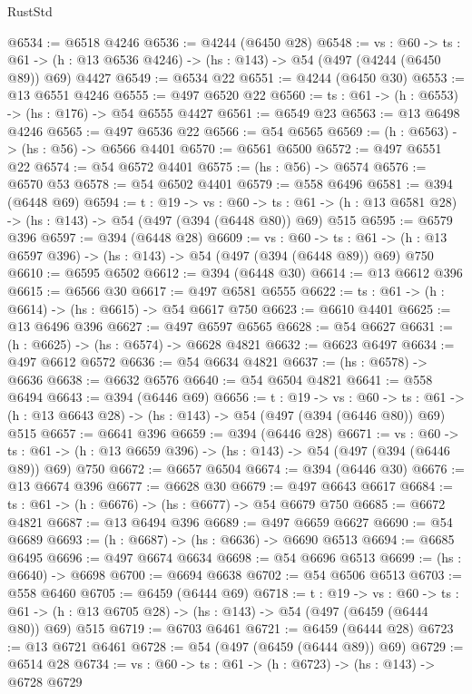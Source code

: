 \begin{lexlean}{RustStd}
\begin{coremodule}
{\begin{coremodule}
{{{{{{{{{{{{@6534 := @6518 @4246
@6536 := @4244 (@6450 @28)
@6548 := {vs : @60} ->
  {ts : @61} -> (h : @13 @6536 @4246) -> (hs : @143) -> @54 (@497 (@4244 (@6450 @89)) @69) @4427
@6549 := @6534 @22
@6551 := @4244 (@6450 @30)
@6553 := @13 @6551 @4246
@6555 := @497 @6520 @22
@6560 := {ts : @61} -> (h : @6553) -> (hs : @176) -> @54 @6555 @4427
@6561 := @6549 @23
@6563 := @13 @6498 @4246
@6565 := @497 @6536 @22
@6566 := @54 @6565
@6569 := (h : @6563) -> (hs : @56) -> @6566 @4401
@6570 := @6561 @6500
@6572 := @497 @6551 @22
@6574 := @54 @6572 @4401
@6575 := (hs : @56) -> @6574
@6576 := @6570 @53
@6578 := @54 @6502 @4401
@6579 := @558 @6496
@6581 := @394 (@6448 @69)
@6594 := {t : @19} ->
  {vs : @60} ->
  {ts : @61} -> (h : @13 @6581 @28) -> (hs : @143) -> @54 (@497 (@394 (@6448 @80)) @69) @515
@6595 := @6579 @396
@6597 := @394 (@6448 @28)
@6609 := {vs : @60} ->
  {ts : @61} -> (h : @13 @6597 @396) -> (hs : @143) -> @54 (@497 (@394 (@6448 @89)) @69) @750
@6610 := @6595 @6502
@6612 := @394 (@6448 @30)
@6614 := @13 @6612 @396
@6615 := @6566 @30
@6617 := @497 @6581 @6555
@6622 := {ts : @61} -> (h : @6614) -> (hs : @6615) -> @54 @6617 @750
@6623 := @6610 @4401
@6625 := @13 @6496 @396
@6627 := @497 @6597 @6565
@6628 := @54 @6627
@6631 := (h : @6625) -> (hs : @6574) -> @6628 @4821
@6632 := @6623 @6497
@6634 := @497 @6612 @6572
@6636 := @54 @6634 @4821
@6637 := (hs : @6578) -> @6636
@6638 := @6632 @6576
@6640 := @54 @6504 @4821
@6641 := @558 @6494
@6643 := @394 (@6446 @69)
@6656 := {t : @19} ->
  {vs : @60} ->
  {ts : @61} -> (h : @13 @6643 @28) -> (hs : @143) -> @54 (@497 (@394 (@6446 @80)) @69) @515
@6657 := @6641 @396
@6659 := @394 (@6446 @28)
@6671 := {vs : @60} ->
  {ts : @61} -> (h : @13 @6659 @396) -> (hs : @143) -> @54 (@497 (@394 (@6446 @89)) @69) @750
@6672 := @6657 @6504
@6674 := @394 (@6446 @30)
@6676 := @13 @6674 @396
@6677 := @6628 @30
@6679 := @497 @6643 @6617
@6684 := {ts : @61} -> (h : @6676) -> (hs : @6677) -> @54 @6679 @750
@6685 := @6672 @4821
@6687 := @13 @6494 @396
@6689 := @497 @6659 @6627
@6690 := @54 @6689
@6693 := (h : @6687) -> (hs : @6636) -> @6690 @6513
@6694 := @6685 @6495
@6696 := @497 @6674 @6634
@6698 := @54 @6696 @6513
@6699 := (hs : @6640) -> @6698
@6700 := @6694 @6638
@6702 := @54 @6506 @6513
@6703 := @558 @6460
@6705 := @6459 (@6444 @69)
@6718 := {t : @19} ->
  {vs : @60} ->
  {ts : @61} -> (h : @13 @6705 @28) -> (hs : @143) -> @54 (@497 (@6459 (@6444 @80)) @69) @515
@6719 := @6703 @6461
@6721 := @6459 (@6444 @28)
@6723 := @13 @6721 @6461
@6728 := @54 (@497 (@6459 (@6444 @89)) @69)
@6729 := @6514 @28
@6734 := {vs : @60} -> {ts : @61} -> (h : @6723) -> (hs : @143) -> @6728 @6729
}}}}}}}}}}}}
\end{coremodule}}
\end{coremodule}
\end{lexlean}
